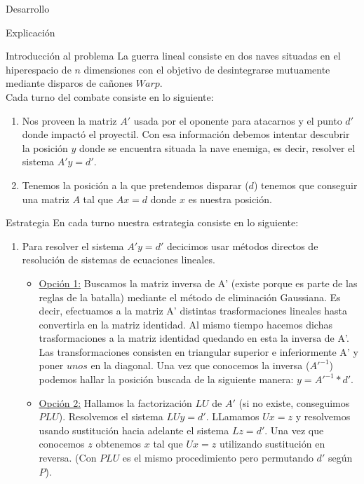 \begin{section}{Desarrollo}
	\begin{subsection}{Explicación}
		\begin{subsubsection}{Introducción al problema}
			La guerra lineal consiste en dos naves situadas en el hiperespacio de $n$ dimensiones con el objetivo de desintegrarse mutuamente mediante disparos de cañones $Warp$.\\
			
			Cada turno del combate consiste en lo siguiente:
			\begin{enumerate}
			\item Nos proveen la matriz $A'$ usada por el oponente para atacarnos y el punto $d'$ donde impactó el proyectil. Con esa información debemos intentar descubrir la posición $y$ donde se encuentra situada la nave enemiga, es decir, resolver el sistema $A'y=d'$.
					
			\item Tenemos la posición a la que pretendemos disparar ($d$) tenemos que conseguir una matriz $A$ tal que $Ax=d$ donde $x$ es nuestra posición.
			\end{enumerate}
		\end{subsubsection}
		\begin{subsubsection}{Estrategia}
			En cada turno nuestra estrategia consiste en lo siguiente:
			
			\begin{enumerate}
			\item Para resolver el sistema $A'y=d'$ decicimos usar métodos directos de resolución de sistemas de ecuaciones lineales.
				\begin{itemize}
					\item \underline{Opción 1:} Buscamos la matriz inversa de A' (existe porque es parte de las reglas de la batalla) mediante el método de eliminación Gaussiana. Es decir, efectuamos a la matriz A' distintas trasformaciones lineales hasta convertirla en la matriz identidad. Al mismo tiempo hacemos dichas trasformaciones a la matriz identidad quedando en esta la inversa de A'.
					Las transformaciones consisten en triangular superior e inferiormente A' y poner $unos$ en la diagonal.
					Una vez que conocemos la inversa ($A'^{-1}$) podemos hallar la posición buscada de la siguiente manera: $y=A'^{-1}*d'$.\\
					
					\item \underline{Opción 2:} Hallamos la factorización $LU$ de $A'$ (si no existe, conseguimos $PLU$). Resolvemos el sistema $LUy=d'$. LLamamos $Ux=z$ y resolvemos usando sustitución hacia adelante el sistema $Lz=d'$. Una vez que conocemos $z$ obtenemos $x$ tal que $Ux=z$ utilizando sustitución en reversa. (Con $PLU$ es el mismo procedimiento pero permutando $d'$ según $P$).\\
					

\end{itemize}
\end{enumerate}
\end{subsubsection}
\end{subsection}
\end{section}
